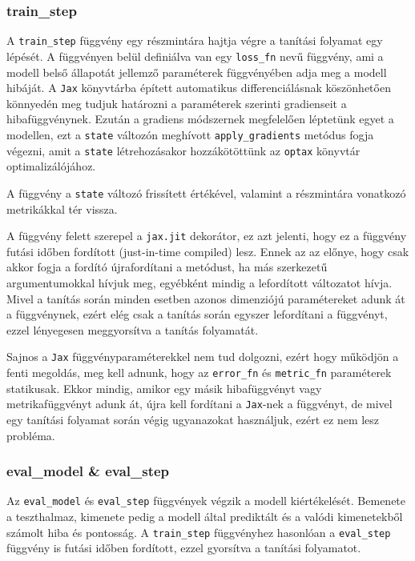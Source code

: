 \subsubsection{train\_step}
A \texttt{train\_step} függvény egy részmintára hajtja végre a tanítási folyamat egy lépését.
A függvényen belül definiálva van egy \texttt{loss\_fn} nevű függvény, ami a modell belső állapotát
jellemző paraméterek függvényében adja meg a modell hibáját. A \texttt{Jax} könyvtárba épített
automatikus differenciálásnak köszönhetően könnyedén meg tudjuk határozni a paraméterek szerinti gradienseit
a hibafüggvénynek. Ezután a gradiens módszernek megfelelően léptetünk egyet a modellen, ezt a \texttt{state}
változón meghívott \texttt{apply\_gradients} metódus fogja végezni, amit a \texttt{state} létrehozásakor
hozzákötöttünk az \texttt{optax} könyvtár optimalizálójához.

A függvény a \texttt{state} változó frissített értékével, valamint a részmintára
vonatkozó metrikákkal tér vissza.

A függvény felett szerepel a \texttt{jax.jit} dekorátor, ez azt jelenti, hogy ez a függvény
futási időben fordított (just-in-time compiled) lesz. Ennek az az előnye, hogy csak akkor 
fogja a fordító újrafordítani a metódust, ha más szerkezetű argumentumokkal hívjuk meg,
egyébként mindig a lefordított változatot hívja.
Mivel a tanítás során minden esetben azonos dimenziójú paramétereket adunk át a függvénynek,
ezért elég csak a tanítás során egyszer lefordítani a függvényt, ezzel lényegesen
meggyorsítva a tanítás folyamatát.

Sajnos a \texttt{Jax} függvényparaméterekkel nem tud dolgozni, ezért hogy működjön a fenti megoldás,
meg kell adnunk, hogy az \texttt{error\_fn} és \texttt{metric\_fn} paraméterek statikusak. Ekkor
mindig, amikor egy másik hibafüggvényt vagy metrikafüggvényt adunk át, újra kell fordítani a
\texttt{Jax}-nek a függvényt, de mivel egy tanítási folyamat során végig ugyanazokat használjuk,
ezért ez nem lesz probléma.

\subsubsection{eval\_model \& eval\_step}
Az \texttt{eval\_model} és \texttt{eval\_step} függvények végzik a modell kiértékelését.
Bemenete a teszthalmaz, kimenete pedig a modell által prediktált és a valódi
kimenetekből számolt hiba és pontosság. A \texttt{train\_step} függvényhez hasonlóan
a \texttt{eval\_step} függvény is futási időben fordított, ezzel gyorsítva a tanítási folyamatot.

